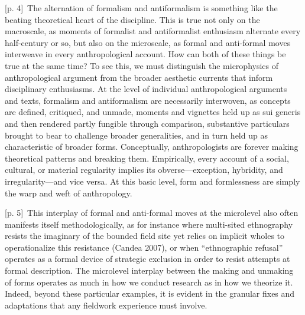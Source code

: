 \documentclass[10pt,a4paper]{article}
\begin{document}
{\scriptsize\color{gray} [p. 4]}\ The alternation of formalism and antiformalism is something like the beating theoretical heart of the discipline. This is true not only on the macroscale, as moments of formalist and antiformalist enthusiasm alternate every half-century or so, but also on the microscale, as formal and anti-formal moves interweave in every anthropological account. How can both of these things be true at the same time? To see this, we must distinguish the microphysics of anthropological argument from the broader aesthetic currents that inform disciplinary enthusiasms. At the level of individual anthropological arguments and texts, formalism and antiformalism are necessarily interwoven, as concepts are defined, critiqued, and unmade, moments and vignettes held up as sui generis and then rendered partly fungible through comparison, substantive particulars brought to bear to challenge broader generalities, and in turn held up as characteristic of broader forms. Conceptually, anthropologists are forever making theoretical patterns and breaking them. Empirically, every account of a social, cultural, or material regularity implies its obverse—exception, hybridity, and irregularity—and vice versa. At this basic level, form and formlessness are simply the warp and weft of anthropology.\par
{\scriptsize\color{gray} [p. 5]}\ This interplay of formal and anti-formal moves at the microlevel also often manifests itself methodologically, as for instance where multi-sited ethnography resists the imaginary of the bounded field site yet relies on implicit wholes to operationalize this resistance (Candea 2007), or when “ethnographic refusal” operates as a formal device of strategic exclusion in order to resist attempts at formal description. The microlevel interplay between the making and unmaking of forms operates as much in how we conduct research as in how we theorize it. Indeed, beyond these particular examples, it is evident in the granular fixes and adaptations that any fieldwork experience must involve.\par
\end{document}
